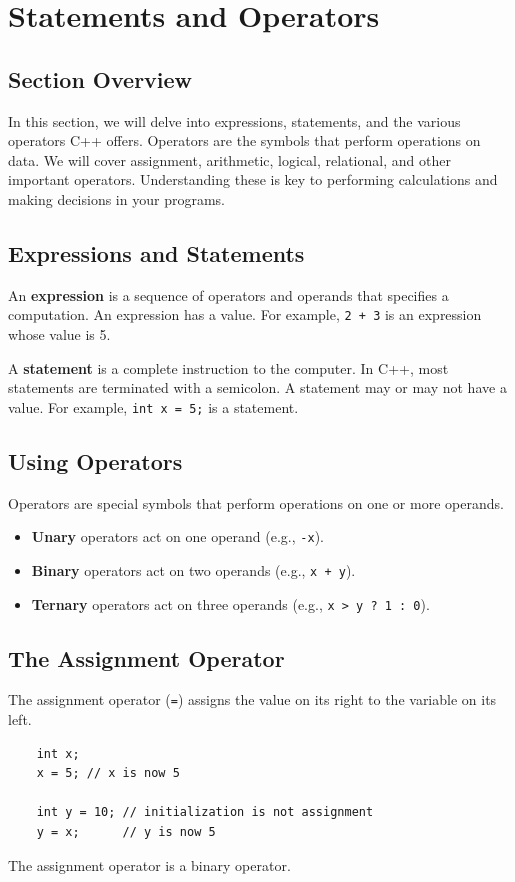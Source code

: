 \section{Statements and Operators}

\subsection{Section Overview}
In this section, we will delve into expressions, statements, and the various operators C++ offers. Operators are the symbols that perform operations on data. We will cover assignment, arithmetic, logical, relational, and other important operators. Understanding these is key to performing calculations and making decisions in your programs.

\subsection{Expressions and Statements}
An \textbf{expression} is a sequence of operators and operands that specifies a computation. An expression has a value. For example, \texttt{2 + 3} is an expression whose value is 5.

A \textbf{statement} is a complete instruction to the computer. In C++, most statements are terminated with a semicolon. A statement may or may not have a value. For example, \texttt{int x = 5;} is a statement.

\subsection{Using Operators}
Operators are special symbols that perform operations on one or more operands.
\begin{itemize}
	\item \textbf{Unary} operators act on one operand (e.g., \texttt{-x}).
	\item \textbf{Binary} operators act on two operands (e.g., \texttt{x + y}).
	\item \textbf{Ternary} operators act on three operands (e.g., \texttt{x > y ? 1 : 0}).
\end{itemize}

\subsection{The Assignment Operator}
The assignment operator (\texttt{=}) assigns the value on its right to the variable on its left.
\begin{lstlisting}
	int x;
	x = 5; // x is now 5

	int y = 10; // initialization is not assignment
	y = x;      // y is now 5
\end{lstlisting}
The assignment operator is a binary operator.

